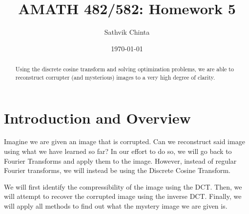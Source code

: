 \documentclass[11pt]{amsart}
\title{AMATH 482/582: Homework 5}
\author{Sathvik Chinta} %
\date{\today} %
\begin{document}
\maketitle 

\begin{abstract}
    Using the discrete cosine transform and solving optimization problems, we are 
    able to reconstruct corrupter (and mysterious) images to a very high degree of 
    clarity. 
\end{abstract}


\section{Introduction and Overview}\label{sec:Introduction}
Imagine we are given an image that is corrupted. Can we reconstruct said image using what we have learned so far? 
In our effort to do so, we will go back to Fourier Transforms and apply them to the image.
However, instead of regular Fourier transforms, we will instead be using the Discrete Cosine Transform.

We will first identify the compressibility of the image using the DCT. 
Then, we will attempt to recover the corrupted image using the inverse DCT. Finally, we 
will apply all methods to find out what the mystery image we are given is. 
\end{document}
